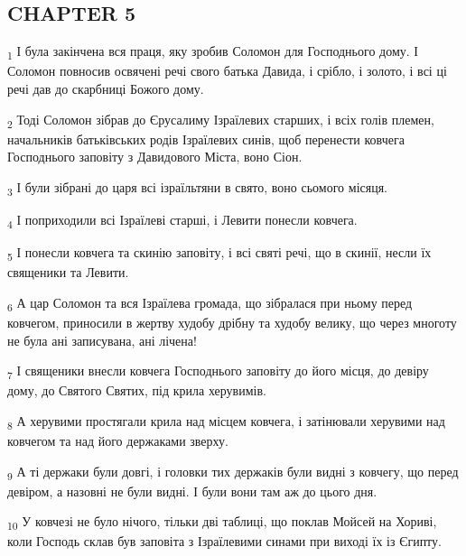 \subsection{CHAPTER 5}
\begin{tcolorbox}
\textsubscript{1} І була закінчена вся праця, яку зробив Соломон для Господнього дому. І Соломон повносив освячені речі свого батька Давида, і срібло, і золото, і всі ці речі дав до скарбниці Божого дому.
\end{tcolorbox}
\begin{tcolorbox}
\textsubscript{2} Тоді Соломон зібрав до Єрусалиму Ізраїлевих старших, і всіх голів племен, начальників батьківських родів Ізраїлевих синів, щоб перенести ковчега Господнього заповіту з Давидового Міста, воно Сіон.
\end{tcolorbox}
\begin{tcolorbox}
\textsubscript{3} І були зібрані до царя всі ізраїльтяни в свято, воно сьомого місяця.
\end{tcolorbox}
\begin{tcolorbox}
\textsubscript{4} І поприходили всі Ізраїлеві старші, і Левити понесли ковчега.
\end{tcolorbox}
\begin{tcolorbox}
\textsubscript{5} І понесли ковчега та скинію заповіту, і всі святі речі, що в скинії, несли їх священики та Левити.
\end{tcolorbox}
\begin{tcolorbox}
\textsubscript{6} А цар Соломон та вся Ізраїлева громада, що зібралася при ньому перед ковчегом, приносили в жертву худобу дрібну та худобу велику, що через многоту не була ані записувана, ані лічена!
\end{tcolorbox}
\begin{tcolorbox}
\textsubscript{7} І священики внесли ковчега Господнього заповіту до його місця, до девіру дому, до Святого Святих, під крила херувимів.
\end{tcolorbox}
\begin{tcolorbox}
\textsubscript{8} А херувими простягали крила над місцем ковчега, і затінювали херувими над ковчегом та над його держаками зверху.
\end{tcolorbox}
\begin{tcolorbox}
\textsubscript{9} А ті держаки були довгі, і головки тих держаків були видні з ковчегу, що перед девіром, а назовні не були видні. І були вони там аж до цього дня.
\end{tcolorbox}
\begin{tcolorbox}
\textsubscript{10} У ковчезі не було нічого, тільки дві таблиці, що поклав Мойсей на Хориві, коли Господь склав був заповіта з Ізраїлевими синами при виході їх із Єгипту.
\end{tcolorbox}
